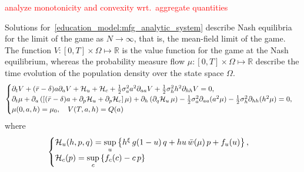 \textcolor{red}{analyze monotonicity and convexity wrt.\ aggregate quantities}


Solutions for~\eqref{education_model:mfg_analytic_system} describe Nash equilibria for the limit of the game as $N \to \infty$,
 that is, the mean-field limit of the game.
The function $V: [0,T] \times \Omega \mapsto \mathbb{R}$ is the value function for the game at the Nash equilibrium,
whereas the probability measure flow $\mu: [0,T] \times \Omega \mapsto \mathbb{R}$ describe the time evolution of the  population density over the state space $\Omega$.
\begin{equation}\label{education_model:mfg_analytic_system}
    \begin{cases}
        \partial_t V + (\bar r  - \delta) a \partial_a V + \mathcal{H}_u  + \mathcal{H}_c + \frac{1}{2} \sigma_a^2 a^2 \partial_{aa} V + \frac{1}{2} \sigma^2_h h^2 \partial_{hh} V = 0,\\
        \partial_t \mu + \partial_a \left( \left[ (\bar r - \delta) a + \partial_p \mathcal{H}_u + \partial_p \mathcal{H}_c \right] \mu \right)  + \partial_h \left( \partial_q \mathcal{H}_u\, \mu\right)  - \frac{1}{2} \sigma_a^2 \partial_{aa} (a^2\mu) - \frac{1}{2} \sigma^2_h \partial_{hh} (h^2\mu) = 0,\\
        \mu(0,a,h) = \mu_0,\quad V(T,a,h) = Q(a)
    \end{cases}
\end{equation}
where
\begin{equation}
    \begin{cases}
        \mathcal{H}_u(h,p,q) = \sup\limits_{u} \left \{ h^\xi \, g(1 - u)\, q + h u \, \bar w (\mu)\, p + f_u(u)\right\},\\
        \mathcal{H}_c(p) = \sup\limits_{c} \left \{  f_c(c) - c \, p \right \}
    \end{cases}
\end{equation}

